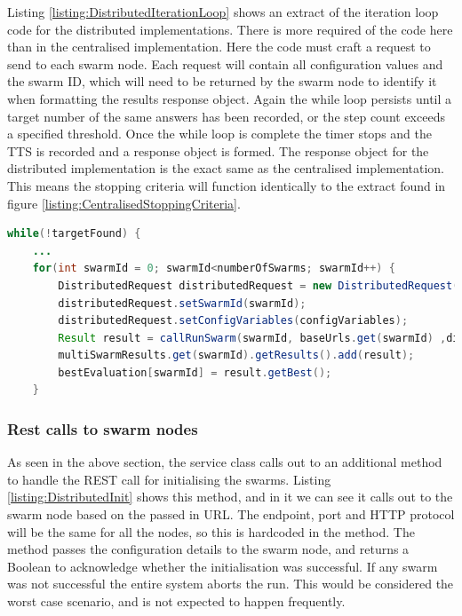 \documentclass[oneside,12pt]{book}
\begin{document}
Listing \ref{listing:DistributedIterationLoop} shows an extract of the iteration loop code for the distributed implementations. There is more required of the code here than in the centralised implementation. Here the code must craft a request to send to each swarm node. Each request will contain all configuration values and the swarm ID, which will need to be returned by the swarm node to identify it when formatting the results response object. Again the while loop persists until a target number of the same answers has been recorded, or the step count exceeds a specified threshold. Once the while loop is complete the timer stops and the TTS is recorded and a response object is formed. The response object for the distributed implementation is the exact same as the centralised implementation. This means the stopping criteria will function identically to the extract found in figure \ref{listing:CentralisedStoppingCriteria}.

\begin{lstlisting}[basicstyle=\footnotesize, language=Java]
while(!targetFound) {
    ...
    for(int swarmId = 0; swarmId<numberOfSwarms; swarmId++) {
        DistributedRequest distributedRequest = new DistributedRequest();
        distributedRequest.setSwarmId(swarmId);
        distributedRequest.setConfigVariables(configVariables);
        Result result = callRunSwarm(swarmId, baseUrls.get(swarmId) ,distributedRequest);
        multiSwarmResults.get(swarmId).getResults().add(result);
        bestEvaluation[swarmId] = result.getBest();
    }
\end{lstlisting}
\label{listing:DistributedIterationLoop}

\subsubsection{Rest calls to swarm nodes}
As seen in the above section, the service class calls out to an additional method to handle the REST call for initialising the swarms. Listing \ref{listing:DistributedInit} shows this method, and in it we can see it calls out to the swarm node based on the passed in URL. The endpoint, port and HTTP protocol will be the same for all the nodes, so this is hardcoded in the method. The method passes the configuration details to the swarm node, and returns a Boolean to acknowledge whether the initialisation was successful. If any swarm was not successful the entire system aborts the run. This would be considered the worst case scenario, and is not expected to happen frequently. 
\end{document}
